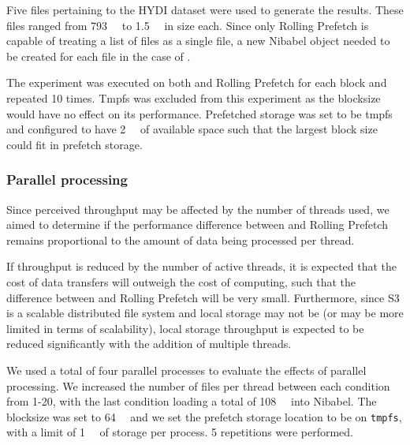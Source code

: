 \documentclass[conference]{IEEEtran}
\begin{document}
Five files pertaining to the HYDI dataset were used to generate the results.
These files ranged from \SI{793}{\mebi\byte} to
\SI{1.5}{\gibi\byte} in size each. Since only Rolling Prefetch is capable of treating a list of files as a single file, a new
Nibabel object needed to be created for each file in the case of \sfs.

The experiment was executed on both \sfs and Rolling Prefetch for each block and repeated 10 times. Tmpfs was excluded from this
experiment as the \sfs blocksize would have no effect on its performance. Prefetched storage was set to be tmpfs and
configured to have \SI{2}{\gibi\byte} of available space such that the largest block size could fit in prefetch
storage.

\subsubsection{Parallel processing}\label{exp:parallel}

Since perceived
throughput may be affected by the number of threads used, we aimed to determine if the performance difference
between \sfs and Rolling Prefetch remains proportional to the amount of data being processed per thread. 

If throughput is reduced by the number of active threads, it is expected that 
the cost of data transfers will outweigh the cost of computing, such that the difference between \sfs and Rolling Prefetch will
be very small. Furthermore, since S3 is a scalable distributed file system and local storage may not be (or may be more limited in terms of scalability), local storage
throughput is expected to be reduced significantly with the addition of multiple threads. 

We used a total of four parallel processes to evaluate the effects of parallel processing. We increased the number of
files per thread between each condition from 1-20, with the last condition loading
a total of \SI{108}{\gibi\byte} into Nibabel. The blocksize was set to \SI{64}{\mebi\byte} and we set the prefetch
storage location to be on \texttt{tmpfs}, with a limit of \SI{1}{\gibi\byte} of storage per process. 5 repetitions were
performed.
\end{document}
